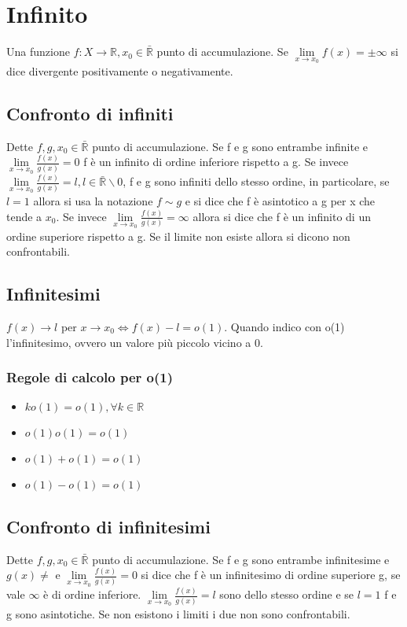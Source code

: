 \chapter{Infinito}
Una funzione $f:X\rightarrow \mathbb{R}, x_0\in\bar{\mathbb{R}}$ punto di accumulazione. Se $\lim\limits_{x\rightarrow x_0}f(x)=\pm\infty$ si dice divergente positivamente o 
negativamente.
\section{Confronto di infiniti}
Dette $f,g,x_0\in\bar{\mathbb{R}}$ punto di accumulazione. Se f e g sono entrambe infinite e $\lim\limits_{x\rightarrow x_0}\frac{f(x)}{g(x)}=0$ f \`e un infinito di ordine 
inferiore rispetto a g. Se invece $\lim\limits_{x\rightarrow x_0}\frac{f(x)}{g(x)}=l, l\in\bar{\mathbb{R}}\backslash 0$, f e g sono infiniti dello stesso ordine, in 
particolare, se $l=1$ allora si usa la notazione $f\sim g$ e si dice che f \`e asintotico a g per x che tende a $x_0$. Se invece $\lim\limits_{x\rightarrow x_0}\frac{f(x)}
{g(x)}=\infty$ allora si dice che f \`e un infinito di un ordine superiore rispetto a g. Se il limite non esiste allora si dicono non confrontabili.   
\section{Infinitesimi}
$f(x)\rightarrow l $ per $x\rightarrow x_0\Leftrightarrow f(x)-l=o(1)$. Quando indico con o(1) l'infinitesimo, ovvero un valore pi\`u piccolo vicino a 0.
\subsection{Regole di calcolo per o(1)}
\begin{itemize}
\item $ko(1)=o(1),\forall k\in\mathbb{R}$
\item $o(1)o(1)=o(1)$
\item $o(1)+o(1)=o(1)$
\item $o(1)-o(1)=o(1)$
\end{itemize}
\section{Confronto di infinitesimi}
Dette $f,g,x_0\in\bar{\mathbb{R}}$ punto di accumulazione. Se f e g sono entrambe infinitesime e $g(x)\neq $ e $\lim\limits_{x\rightarrow x_0}\frac{f(x)}{g(x)}=0$ si dice 
che f \`e  un infinitesimo di ordine superiore g, se vale $\infty$ \`e di ordine inferiore.  $\lim\limits_{x\rightarrow x_0}\frac{f(x)}{g(x)}=l$ sono dello stesso ordine e 
se $l=1$ f e g sono asintotiche. Se non esistono i limiti i due non sono confrontabili.

